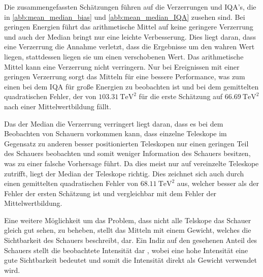 Die zusammengefassten Schätzungen führen auf die Verzerrungen und IQA's, die in \autoref{abb:mean_median_bias} und \autoref{abb:mean_median_IQA} zusehen sind.
Bei geringen Energien führt das arithmetische Mittel auf keine geringere Verzerrung und auch der Median bringt nur eine leichte Verbesserung.
Dies liegt daran, dass eine Verzerrung die Annahme verletzt, dass die Ergebnisse um den wahren Wert liegen, stattdessen liegen sie um einen verschobenen
Wert.
Das arithmetische Mittel kann eine Verzerrung nicht verringern.
Nur bei Ereignissen mit einer geringen Verzerrung sorgt das Mitteln für eine bessere Performance, was zum einen bei dem IQA für große Energien zu beobachten
ist und bei dem gemittelten quadratischen Fehler, der von $\SI{103.31}{\tera\eV\squared}$ für die erste Schätzung auf $\SI{66.69}{\tera\eV\squared}$ nach einer
Mittelwertbildung fällt.

Das der Median die Verzerrung verringert liegt daran, dass es bei dem Beobachten von Schauern vorkommen kann, dass einzelne Teleskope im Gegensatz zu anderen
besser positionierten Teleskopen nur einen geringen Teil des Schauers beobachten und somit weniger Information des Schauers besitzen, was zu einer falsche Vorhersage
führt.
Da dies meist nur auf vereinzelte Teleskope zutrifft, liegt der Median der Teleskope richtig.
Dies zeichnet sich auch durch einen gemittelten quadratischen Fehler von $\SI{68.11}{\tera\eV\squared}$ aus, welcher besser als der Fehler der ersten Schätzung ist und
vergleichbar mit dem Fehler der Mittelwertbildung.

Eine weitere Möglichkeit um das Problem, dass nicht alle Telskope das Schauer gleich gut sehen, zu beheben, stellt das Mitteln mit einem Gewicht, welches die
Sichtbarkeit des Schauers beschreibt, dar.
Ein Indiz auf den gesehenen Anteil des Schauers stellt die beobachtete Intensität dar , wobei eine hohe
Intensität eine gute Sichtbarkeit bedeutet und somit die Intensität direkt als Gewicht verwendet wird.

